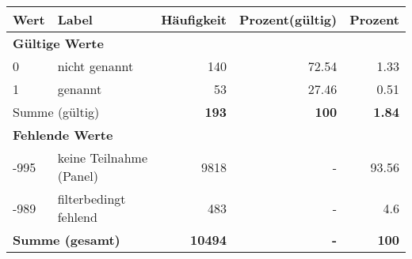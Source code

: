      \begin{longtable}{lXrrr}
     \toprule
     \textbf{Wert} & \textbf{Label} & \textbf{Häufigkeit} & \textbf{Prozent(gültig)} & \textbf{Prozent} \\
     \endhead
     \midrule
     \multicolumn{5}{l}{\textbf{Gültige Werte}}\\

     0 &
     \multicolumn{1}{X}{ nicht genannt   } &


       \num{140} &
       \num[round-mode=places,round-precision=2]{72,54} &
         \num[round-mode=places,round-precision=2]{1,33} \\

     1 &
     \multicolumn{1}{X}{ genannt   } &


       \num{53} &
       \num[round-mode=places,round-precision=2]{27,46} &
         \num[round-mode=places,round-precision=2]{0,51} \\
     \midrule
     \multicolumn{2}{l}{Summe (gültig)} &
       \textbf{\num{193}} &
     \textbf{100} &
       \textbf{\num[round-mode=places,round-precision=2]{1,84}} \\
     \multicolumn{5}{l}{\textbf{Fehlende Werte}}\\
       -995 &
       keine Teilnahme (Panel) &
         \num{9818} &
        - &
         \num[round-mode=places,round-precision=2]{93,56} \\
       -989 &
       filterbedingt fehlend &
         \num{483} &
        - &
         \num[round-mode=places,round-precision=2]{4,6} \\
     \midrule
     \multicolumn{2}{l}{\textbf{Summe (gesamt)}} &
          \textbf{\num{10494}} &
        \textbf{-} &
        \textbf{100} \\
     \bottomrule
     \end{longtable}
     
